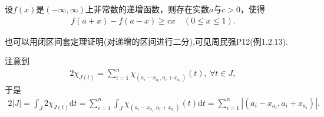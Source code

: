 \documentclass[../../main.tex]{subfiles}%
\begin{document}
\begin{example}
设$f(x)$是$(-\infty,\infty)$上非常数的递增函数，则存在实数$a$与$c>0$，使得
\begin{align*}
f(a+x)-f(a-x)\geqslant cx\quad (0\leqslant x\leqslant 1).
\end{align*}
\end{example}
\begin{note}
也可以用闭区间套定理证明(对递增的区间进行二分),可见周民强P12(例1.2.13).
\end{note}
\begin{remark}
注意到
\begin{align*}
2\chi_{J(t)} = \sum_{i=1}^n \chi_{(a_i - x_{a_i}, a_i + x_{a_i})}(t), \ \forall t \in J,
\end{align*}
于是
\begin{align*}
2|J| = \int_J 2\chi_{J(t)}\mathrm{d}t = \sum_{i=1}^n \int_J \chi_{(a_i - x_{a_i}, a_i + x_{a_i})}(t)\mathrm{d}t = \sum_{i=1}^n |(a_i - x_{a_i}, a_i + x_{a_i})|.
\end{align*}
\end{remark}
\end{document}
